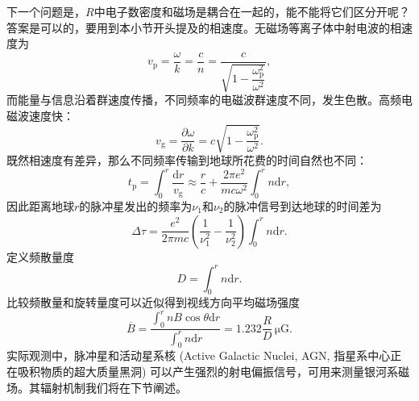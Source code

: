 \documentclass[../天体物理基础.tex]{subfiles}
\begin{document}
\newpage
下一个问题是，$R$中电子数密度和磁场是耦合在一起的，能不能将它们区分开呢？答案是可以的，要用到本小节开头提及的相速度。无磁场等离子体中射电波的相速度为
\begin{equation}
v_{\text{p}}=\frac{\omega}{k}=\frac{c}{n}=\frac{c}{\sqrt{1-\dfrac{\omega_{\text{p}}^{2}}{\omega^{2}}}},
\end{equation}
而能量与信息沿着群速度传播，不同频率的电磁波群速度不同，发生色散。高频电磁波速度快：
\begin{equation}
v_{\text{g}}=\frac{\partial{}\omega}{\partial{}k}=c\sqrt{1-\frac{\omega_{\text{p}}^{2}}{\omega^{2}}}.
\end{equation}
既然相速度有差异，那么不同频率传输到地球所花费的时间自然也不同：
\begin{equation}
t_{\text{p}}=\int_{0}^{r}\frac{\mathrm{d}r}{v_{\text{g}}}\approx\frac{r}{c}+\frac{2\pi e^{2}}{mc\omega^{2}}\int_{0}^{r}n\mathrm{d}r,
\end{equation}
因此距离地球$r$的脉冲星发出的频率为$\nu_{1}$和$\nu_{2}$的脉冲信号到达地球的时间差为
\begin{equation}
\Delta{}\tau=\frac{e^{2}}{2\pi mc}\left(\frac{1}{\nu_{1}^{2}}-\frac{1}{\nu_{2}^{2}}\right)\int_{0}^{r}n\mathrm{d}r.
\end{equation}
定义频散量度
\begin{equation}
D=\int_{0}^{r}n\mathrm{d}r.
\end{equation}
比较频散量和旋转量度可以近似得到视线方向平均磁场强度
\begin{equation}
\overline{B}=\frac{\int_{0}^{r}nB\cos\theta\mathrm{d}r}{\int_{0}^{r}n\mathrm{d}r}=1.232\frac{R}{D}\,\mathrm{\mu G}.
\end{equation}
实际观测中，脉冲星和活动星系核 (Active Galactic Nuclei, AGN, 指星系中心正在吸积物质的超大质量黑洞) 可以产生强烈的射电偏振信号，可用来测量银河系磁场。其辐射机制我们将在下节阐述。
\end{document}
